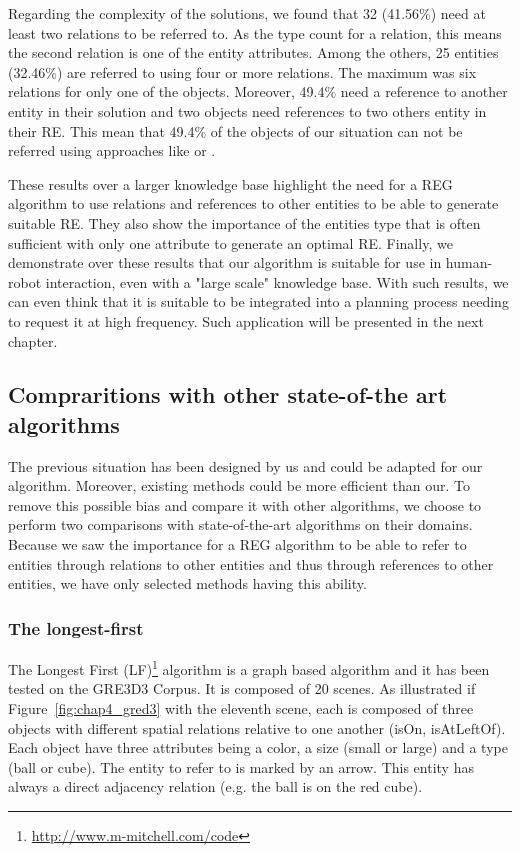 Regarding the complexity of the solutions, we found that 32 (41.56\%) need at least two relations to be referred to. As the type count for a relation, this means the second relation is one of the entity attributes. Among the others, 25 entities (32.46\%) are referred to using four or more relations. The maximum was six relations for only one of the objects. Moreover, 49.4\% need a reference to another entity in their solution and two objects need references to two others entity in their RE. This mean that 49.4\% of the objects of our situation can not be referred using approaches like \cite{ros_2010_which} or \cite{dale_1995_computational}.

These results over a larger knowledge base highlight the need for a REG algorithm to use relations and references to other entities to be able to generate suitable RE. They also show the importance of the entities type that is often sufficient with only one attribute to generate an optimal RE. Finally, we demonstrate over these results that our algorithm is suitable for use in human-robot interaction, even with a "large scale" knowledge base. With such results, we can even think that it is suitable to be integrated into a planning process needing to request it at high frequency. Such application will be presented in the next chapter.

\subsection{Compraritions with other state-of-the art algorithms}

The previous situation has been designed by us and could be adapted for our algorithm. Moreover, existing methods could be more efficient than our. To remove this possible bias and compare it with other algorithms, we choose to perform two comparisons with state-of-the-art algorithms on their domains. Because we saw the importance for a REG algorithm to be able to refer to entities through relations to other entities and thus through references to other entities, we have only selected methods having this ability.

\subsubsection{The longest-first}

The Longest First (LF)\footnote{\url{http://www.m-mitchell.com/code}} algorithm \cite{viethen_2013_graphs} is a graph based algorithm and it has been tested on the GRE3D3 Corpus. It is composed of 20 scenes. As illustrated if Figure~\ref{fig:chap4_gred3} with the eleventh scene, each is composed of three objects with different spatial relations relative to one another (isOn, isAtLeftOf). Each object have three attributes being a color, a size (small or large) and a type (ball or cube). The entity to refer to is marked by an arrow. This entity has always a direct adjacency relation (e.g. the ball is on the red cube).

